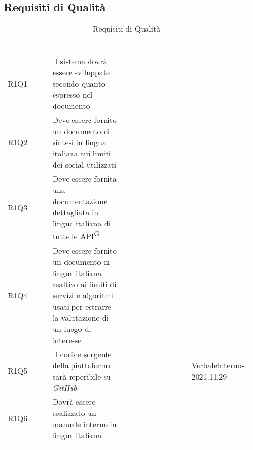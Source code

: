 \subsection{Requisiti di Qualità}


\renewcommand{\arraystretch}{1.5}
\begin{longtable}{ m{}<{\centering}  m{}<{\centering}  m{}<{\centering}  m{}<{\centering}}
	\rowcolor{darkblue}
	\textcolor{white}{\textbf{Requisito}} &\textcolor{white}{\textbf{Descrizione}}& \textcolor{white}{\textbf{Classificazione}} & \textcolor{white}{\textbf{Fonti}}\\ 

	R1Q1 & Il sistema dovrà essere sviluppato secondo quanto espresso nel documento \textit{\NdP} & \Ob & \Di \\
	
	R1Q2 & Deve essere fornito un documento di sintesi in lingua italiana sui limiti dei social utilizzati & \Ob & \Ca \\
	
	R1Q3 & Deve essere fornita una documentazione dettagliata in lingua italiana di tutte le API\textsuperscript{G} & \Ob & \Ca \\

	R1Q4 & Deve essere fornito un documento in lingua italiana realtivo ai limiti di servizi e algoritmi usati per estrarre la valutazione di un luogo di interesse & \Ob & \Ca \\

	R1Q5 & Il codice sorgente della piattaforma sarà reperibile su \textit{GitHub} & \Ob & VerbaleInterno-2021.11.29 \\
	
	R1Q6 & Dovrà essere realizzato un manuale interno in lingua italiana  & \Ob & \Di \\

	\hiderowcolors \caption{Requisiti di Qualità}
\end{longtable}

\clearpage